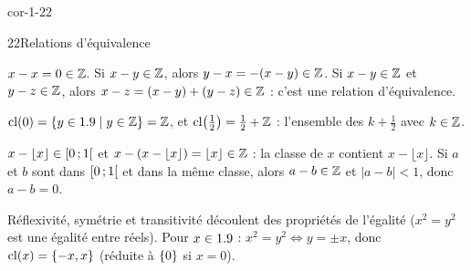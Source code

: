 \begin{blocLivre}{cor-1-22}
\begin{corrige}{22}{Relations d'équivalence}
\begin{questions}
  \item \begin{questions}
    \item {} $x-x=0\in\mathbb{Z}$.\quad
       Si $x-y\in\mathbb{Z}$, alors $y-x=-(x-y)\in\mathbb{Z}$.\quad
       Si $x-y\in\mathbb{Z}$ et $y-z\in\mathbb{Z}$, alors $x-z=(x-y)+(y-z)\in\mathbb{Z}$ :
      c'est une relation d'équivalence.
    \item $\mathrm{cl}(0)=\left\{y\in1.9 \mid y\in\mathbb{Z}\right\}=\mathbb{Z}$, et $\mathrm{cl}\bigl(\tfrac12\bigr)=\tfrac12+\mathbb{Z}$ :
      l'ensemble des $k+\tfrac12$ avec $k\in\mathbb{Z}$.
    \item {} $x-\lfloor x\rfloor\in\mathopen{[}0\,{;}\,1\mathclose{[}$ et
      $x-(x-\lfloor x\rfloor)=\lfloor x\rfloor\in\mathbb{Z}$ : la classe de $x$ contient $x-\lfloor x\rfloor$.\quad
       Si $a$ et $b$ sont dans $\mathopen{[}0\,{;}\,1\mathclose{[}$ et dans la même classe, alors $a-b\in\mathbb{Z}$
      et $|a-b|<1$, donc $a-b=0$.
    \end{questions}
  \item Réflexivité, symétrie et transitivité découlent des propriétés de l'égalité ($x^{2}=y^{2}$ est
    une égalité entre réels). Pour $x\in1.9$ : $x^{2}=y^{2}\iff y=\pm x$, donc
    $\mathrm{cl}(x)=\left\{-x,x\right\}$ (réduite à $\left\{0\right\}$ si $x=0$).
\end{questions}
\end{corrige}
\end{blocLivre}

